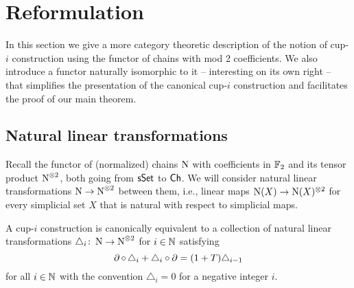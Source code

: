 
\section{Reformulation}\label{s:reformulation}

In this section we give a more category theoretic description of the notion of \mbox{cup-$i$} construction using the functor of chains with mod 2 coefficients.
We also introduce a functor naturally isomorphic to it -- interesting on its own right -- that simplifies the presentation of the canonical cup-$i$ construction and facilitates the proof of our main theorem.

\subsection{Natural linear transformations}

Recall the functor of (normalized) chains $\operatorname{N}$ with coefficients in ${\mathbb{F}_2}$ and its tensor product $\operatorname{N}^{\otimes 2}$, both going from $\mathsf{sSet}$ to $\mathsf{Ch}$.
We will consider natural linear transformations $\operatorname{N} \to \operatorname{N}^{\otimes 2}$ between them, i.e., linear maps $\operatorname{N}(X) \to \operatorname{N}(X)^{\otimes 2}$ for every simplicial set $X$ that is natural with respect to simplicial maps.

\begin{lemma}\label{l:coalgebra}
	A \mbox{cup-$i$} construction is canonically equivalent to a collection of natural linear transformations $\triangle_i \colon \operatorname{N} \to \operatorname{N}^{\otimes 2}$ for $i \in \mathbb{N}$ satisfying
	\[
	\operatorname{\partial} \circ \, \triangle_i + \triangle_i \circ \operatorname{\partial} =
	(1+T) \triangle_{i-1}
	\]
	for all $i \in \mathbb{N}$ with the convention $\triangle_{i} = 0$ for a negative integer $i$.
\end{lemma}

